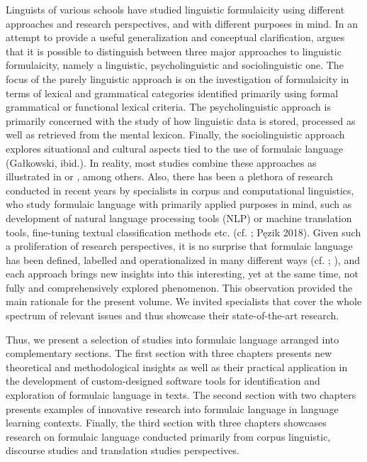 \documentclass[output=paper]{langsci/langscibook}
\begin{document}
Linguists of various schools have studied linguistic formulaicity using different approaches and research perspectives, and with different purposes in mind. In an attempt to provide a useful generalization and conceptual clarification, \citet[163--164]{galkowski_kompetencja_nodate} argues that it is possible to distinguish between three major approaches to linguistic formulaicity, namely a linguistic, psycholinguistic and sociolinguistic one. The focus of the purely linguistic approach is on the investigation of formulaicity in terms of lexical and grammatical categories identified primarily using formal grammatical or functional lexical criteria. The psycholinguistic approach is primarily concerned with the study of how linguistic data is stored, processed as well as retrieved from the mental lexicon. Finally, the sociolinguistic approach explores situational and cultural aspects tied to the use of formulaic language (Gałkowski, ibid.). In reality, most studies combine these approaches as illustrated in \citet{SchmittCarter2004,Wood2010a,Wood2010b,Wood2015,Wray2002} or \citet{UnderwoodEtAl2004,PiirainenEtAl2020}, among others. Also, there has been a plethora of research conducted in recent years by specialists in corpus and computational linguistics, who study formulaic language with primarily applied purposes in mind, such as development of %
natural language processing tools (NLP) or machine translation tools, fine-tuning textual classification methods etc. (cf. \citealt{ForsythGrabowski2015}; Pęzik 2018). Given such a proliferation of research perspectives, it is no surprise that formulaic language has been defined, labelled and operationalized in many different ways (cf. \citealt{WrayPerkins2000}; \citealt{Wray2002,Wray2009}), and each approach brings new insights into this interesting, yet at the same time, not fully and comprehensively explored phenomenon. This observation provided the main rationale for the present volume. We invited specialists that cover the whole spectrum of relevant issues and thus showcase their state-of-the-art research.



Thus, we present a selection of studies into formulaic language arranged into complementary sections. The first section with three chapters presents new theoretical and methodological insights as well as their practical application in the development of custom-designed software tools for identification and exploration of formulaic language in texts. The second section with two chapters presents examples of innovative research into formulaic language in language learning contexts. Finally, the third section with three chapters showcases research on formulaic language conducted primarily %
%
from corpus linguistic, discourse studies and translation studies perspectives.
\end{document}
